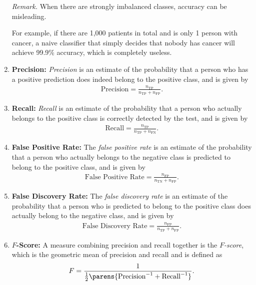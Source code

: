 \documentclass[12pt]{article}
\begin{document}
\begin{enumerate}[label=\textbf{\arabic*.}]
	\textit{Remark.} When there are strongly imbalanced classes, accuracy can be misleading. 
	
	For example, if there are 1,000 patients in total and is only 1 person with cancer, a naive classifier that simply decides that nobody has cancer will achieve 99.9\% accuracy, which is completely useless. 
	
	\item \textbf{Precision:} \textit{Precision} is an estimate of the probability that a person who has a positive prediction does indeed belong to the positive class, and is given by 
	\begin{align*}
		\mathrm{Precision} = \frac{n_{\mathrm{TP}}}{n_{\mathrm{TP}} + n_{\mathrm{FP}}}. 
	\end{align*}
	
	\item \textbf{Recall:} \textit{Recall} is an estimate of the probability that a person who actually belongs to the positive class is correctly detected by the test, and is given by
	\begin{align*}
		\mathrm{Recall} = \frac{n_{\mathrm{TP}}}{n_{\mathrm{TP}} + n_{\mathrm{FN}}}. 
	\end{align*}
	
	\item \textbf{False Positive Rate:} The \emph{false positive rate} is an estimate of the probability that a person who actually belongs to the negative class is predicted to belong to the positive class, and is given by 
	\begin{align*}
		\text{False Positive Rate} = \frac{n_{\mathrm{FP}}}{n_{\mathrm{TN}} + n_{\mathrm{FP}}}. 
	\end{align*}
	
	\item \textbf{False Discovery Rate:} The \emph{false discovery rate} is an estimate of the probability that a person who is predicted to belong to the positive class does actually belong to the negative class, and is given by 
	\begin{align*}
		\text{False Discovery Rate} = \frac{n_{\mathrm{FP}}}{n_{\mathrm{TP}} + n_{\mathrm{FP}}}. 
	\end{align*}
	
	\item \textbf{$F$-Score:} A measure combining precision and recall together is the \emph{$F$-score}, which is the geometric mean of precision and recall and is  defined as 
	\begin{align*}
		F = \frac{1}{\frac{1}{2} \parens{\mathrm{Precision}^{-1} + \mathrm{Recall}^{-1}}}. 
	\end{align*}
	

\end{enumerate}
\end{document}
